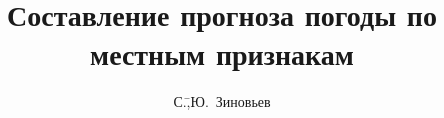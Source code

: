 \author{\LARGE С.\=,Ю.~Зиновьев}
\title{Составление прогноза погоды по местным признакам}
\titlefoot{\theyear}
\maketitle
